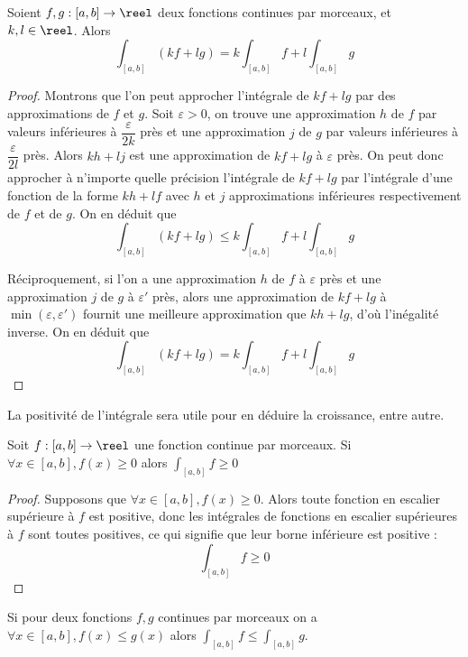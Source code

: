 \begin{prop}[Linéarité]
    Soient $f,g : [a,b]\to\reel$ deux fonctions continues par morceaux, et $k,l\in\reel$. Alors $$\int_{[a,b]} (kf+lg) = k\int_{[a,b]}f + l\int_{[a,b]}g$$
\end{prop}

\begin{proof}
    Montrons que l'on peut approcher l'intégrale de $kf+lg$ par des approximations de $f$ et $g$. Soit $\varepsilon > 0$, on trouve une approximation $h$ de $f$ par valeurs inférieures à $\dfrac{\varepsilon}{2k}$ près et une approximation $j$ de $g$ par valeurs inférieures à $\dfrac{\varepsilon}{2l}$ près. Alors $kh+lj$ est une approximation de $kf+lg$ à $\varepsilon$ près. On peut donc approcher à n'importe quelle précision l'intégrale de $kf+lg$ par l'intégrale d'une fonction de la forme $kh+lf$ avec $h$ et $j$ approximations inférieures respectivement de $f$ et de $g$. On en déduit que $$\int_{[a,b]} (kf+lg) \leq k\int_{[a,b]} f + l \int_{[a,b]} g$$

    Réciproquement, si l'on a une approximation $h$ de $f$ à $\varepsilon$ près et une approximation $j$ de $g$ à $\varepsilon'$ près, alors une approximation de $kf+lg$ à $\min(\varepsilon,\varepsilon')$ fournit une meilleure approximation que $kh+lg$, d'où l'inégalité inverse. On en déduit que $$\boxed{\int_{[a,b]} (kf+lg) = k\int_{[a,b]}f + l\int_{[a,b]}g}$$
\end{proof}

La positivité de l'intégrale sera utile pour en déduire la croissance, entre autre.

\begin{prop}[Positivité]
    Soit $f : [a,b]\to\reel$ une fonction continue par morceaux. Si $\forall x\in[a,b],f(x)\geq 0$ alors $\displaystyle\int_{[a,b]} f \geq 0$
\end{prop}

\begin{proof}
    Supposons que $\forall x\in[a,b], f(x)\geq 0$. Alors toute fonction en escalier supérieure à $f$ est positive, donc les intégrales de fonctions en escalier supérieures à $f$ sont toutes positives, ce qui signifie que leur borne inférieure est positive : $$\boxed{\int_{[a,b]} f \geq 0}$$
\end{proof}

\begin{cor}
    Si pour deux fonctions $f,g$ continues par morceaux on a $\forall x\in[a,b], f(x)\leq g(x)$ alors $\displaystyle\int_{[a,b]} f \leq \int_{[a,b]} g$.
\end{cor}

